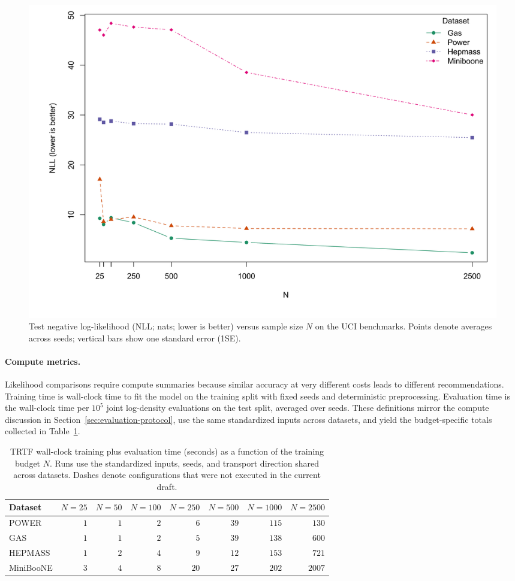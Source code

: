 \documentclass[11pt,a4paper,twoside]{book}\usepackage[]{graphicx}\usepackage[]{xcolor}
\begin{document}
\begin{figure}[htbp]
  \centering
  \includegraphics[width=0.85\linewidth]{figure/N_sensitivity_all.png}
  \caption{Test negative log-likelihood (NLL; nats; lower is better) versus sample size $N$ on the UCI benchmarks. Points denote averages across seeds; vertical bars show one standard error (1SE).}
  \label{fig:n-sensitivity}
\end{figure}

\paragraph{Compute metrics.} Likelihood comparisons require compute summaries because similar accuracy at very different costs leads to different recommendations. Training time is wall-clock time to fit the model on the training split with fixed seeds and deterministic preprocessing. Evaluation time is the wall-clock time per $10^5$ joint log-density evaluations on the test split, averaged over seeds. These definitions mirror the compute discussion in Section~\ref{sec:evaluation-protocol}, use the same standardized inputs across datasets, and yield the budget-specific totals collected in Table~\ref{tab:real-compute}.

\begin{table}[htbp]
  \centering
  \caption{TRTF wall-clock training plus evaluation time (seconds) as a function of the training budget $N$. Runs use the standardized inputs, seeds, and transport direction shared across datasets. Dashes denote configurations that were not executed in the current draft.}
  \label{tab:real-compute}
  \begin{tabular}{lrrrrrrr}
    \hline
    Dataset & $N=25$ & $N=50$ & $N=100$ & $N=250$ & $N=500$ & $N=1000$ & $N=2500$ \\
    \hline
    POWER     & $1$ & $1$ & $2$ & $6$ & $39$ & $115$ & $130$ \\
    GAS       & $1$ & $1$ & $2$ & $5$ & $39$ & $138$ & $600$ \\
    HEPMASS   & $1$ & $2$ & $4$ & $9$ & $12$ & $153$ & $721$ \\
    MiniBooNE & $3$ & $4$ & $8$ & $20$ & $27$ & $202$ & $2007$ \\
    \hline
  \end{tabular}
\end{table}
\end{document}
